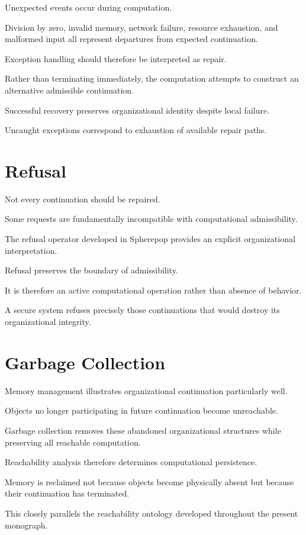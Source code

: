 \documentclass[11pt,oneside]{book}
\numberwithin{equation}{chapter}
\theoremstyle{definition}
\theoremstyle{plain}
\begin{document}
Unexpected events occur during computation.

Division by zero, invalid memory, network failure, resource exhaustion, and
malformed input all represent departures from expected continuation.

Exception handling should therefore be interpreted as repair.

Rather than terminating immediately, the computation attempts to construct
an alternative admissible continuation.

Successful recovery preserves organizational identity despite local
failure.

Uncaught exceptions correspond to exhaustion of available repair paths.

\section{Refusal}

Not every continuation should be repaired.

Some requests are fundamentally incompatible with computational
admissibility.

The refusal operator developed in Spherepop provides an explicit
organizational interpretation.

Refusal preserves the boundary of admissibility.

It is therefore an active computational operation rather than absence of
behavior.

A secure system refuses precisely those continuations that would destroy
its organizational integrity.

\section{Garbage Collection}

Memory management illustrates organizational continuation particularly
well.

Objects no longer participating in future continuation become unreachable.

Garbage collection removes these abandoned organizational structures while
preserving all reachable computation.

Reachability analysis therefore determines computational persistence.

Memory is reclaimed not because objects become physically absent but
because their continuation has terminated.

This closely parallels the reachability ontology developed throughout the
present monograph.
\end{document}
